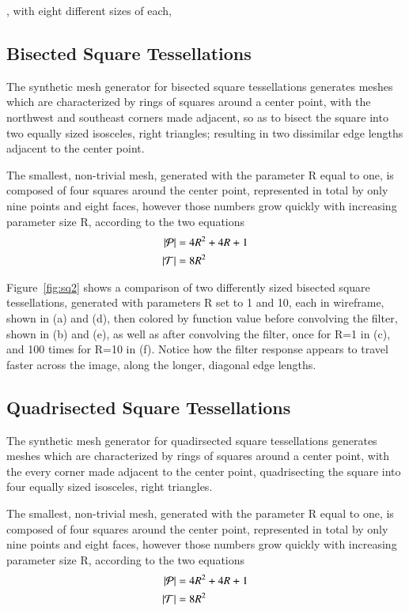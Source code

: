 , with eight different sizes of each,
%
%
%
%
\pagebreak
\subsection{Bisected Square Tessellations}
The synthetic mesh generator for bisected square tessellations generates meshes which are characterized by rings of squares around a center point, with the northwest and southeast corners made adjacent, so as to bisect the square into two equally sized isosceles, right triangles; resulting in two dissimilar edge lengths adjacent to the center point.

The smallest, non-trivial mesh, generated with the parameter R equal to one, is composed of four squares around the center point, represented in total by only nine points and eight faces, however those numbers grow quickly with increasing parameter size R, according to the two equations
\begin{align}
	|\mathcal{P}| &= 4R^2 + 4R + 1 \\
	|\mathcal{T}| &= 8R^2
	\label{eq:sq2PointAndFaceCounts}
\end{align}

Figure~\ref{fig:sq2} shows a comparison of two differently sized bisected square tessellations, generated with parameters R set to 1 and 10, each in wireframe, shown in (a) and (d), then colored by function value before convolving the filter, shown in (b) and (e), as well as after convolving the filter, once for R=1 in (c), and 100 times for R=10 in (f). Notice how the filter response appears to travel faster across the image, along the longer, diagonal edge lengths.



%
%
%
%
\pagebreak
\subsection{Quadrisected Square Tessellations}
The synthetic mesh generator for quadirsected square tessellations generates meshes which are characterized by rings of squares around a center point, with the every corner made adjacent to the center point, quadrisecting the square into four equally sized isosceles, right triangles.

The smallest, non-trivial mesh, generated with the parameter R equal to one, is composed of four squares around the center point, represented in total by only nine points and eight faces, however those numbers grow quickly with increasing parameter size R, according to the two equations
\begin{align}
	|\mathcal{P}| &= 4R^2 + 4R + 1 \\
	|\mathcal{T}| &= 8R^2
	\label{eq:sq2PointAndFaceCounts}
\end{align}

